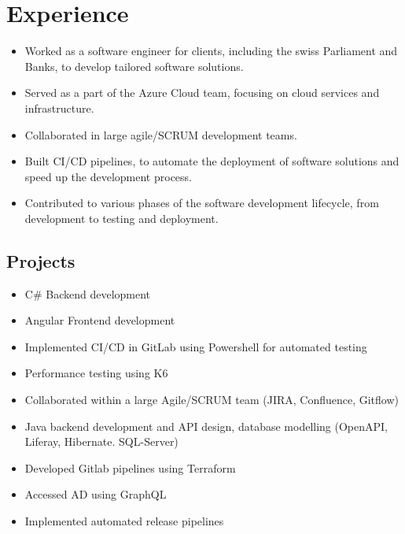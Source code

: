 \section{Experience}
\begin{itemize}
    \item Worked as a software engineer for clients, including the swiss Parliament and Banks, to develop tailored software solutions.
    \item Served as a part of the Azure Cloud team, focusing on cloud services and infrastructure.
    \item Collaborated in large agile/SCRUM development teams.
    \item Built CI/CD pipelines, to automate the deployment of software solutions and speed up the development process.
    \item Contributed to various phases of the software development lifecycle, from development to testing and deployment.
\end{itemize}
\subsection*{Projects}
\begin{itemize}
    \item C\# Backend development
    \item Angular Frontend development
    \item Implemented CI/CD in GitLab using Powershell for automated testing
    \item Performance testing using K6
\end{itemize}
\dottedline
{}
\begin{itemize}
    \item Collaborated within a large Agile/SCRUM team (JIRA, Confluence, Gitflow)
    \item Java backend development and API design, database modelling (OpenAPI, Liferay, Hibernate. SQL-Server)
\end{itemize}
\dottedline
{}
\begin{itemize}
    \item Developed Gitlab pipelines using Terraform
    \item Accessed AD using GraphQL
    \item Implemented automated release pipelines
\end{itemize}

